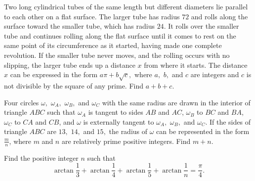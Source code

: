 \documentclass[11pt]{article}
\theoremstyle{definition}
\begin{document}
\begin{question}[name={2007 AIME II, \href{https://artofproblemsolving.com/community/c4p798330}{Problem 11}}]
	Two long cylindrical tubes of the same length but different diameters lie parallel to each other on a flat surface. The larger tube has radius $72$ and rolls along the surface toward the smaller tube, which has radius $24$. It rolls over the smaller tube and continues rolling along the flat surface until it comes to rest on the same point of its circumference as it started, having made one complete revolution. If the smaller tube never moves, and the rolling occurs with no slipping, the larger tube ends up a distance $x$ from where it starts. The distance $x$ can be expressed in the form $a\pi+b\sqrt{c},$ where $a,$ $b,$ and $c$ are integers and $c$ is not divisible by the square of any prime. Find $a+b+c$.
\end{question}


%	









\begin{question}[name={2007 AIME II, \href{https://artofproblemsolving.com/community/c4p798351}{Problem 15}}]
	Four circles $\omega,$ $\omega_{A},$ $\omega_{B},$ and $\omega_{C}$ with the same radius are drawn in the interior of triangle $ABC$ such that $\omega_{A}$ is tangent to sides $AB$ and $AC$, $\omega_{B}$ to $BC$ and $BA$, $\omega_{C}$ to $CA$ and $CB$, and $\omega$ is externally tangent to $\omega_{A},$ $\omega_{B},$ and $\omega_{C}$. If the sides of triangle $ABC$ are $13,$ $14,$ and $15,$ the radius of $\omega$ can be represented in the form $\frac{m}{n}$, where $m$ and $n$ are relatively prime positive integers. Find $m+n$.
\end{question}


%	




\begin{question}[name={2008 AIME I, \href{https://artofproblemsolving.com/community/c4p1075233}{Problem 8}}]
	Find the positive integer $ n$ such that\[\arctan\frac{1}{3}+\arctan\frac{1}{4}+\arctan\frac{1}{5}+\arctan\frac{1}{n}=\frac{\pi}{4}.\]
\end{question}
\end{document}
